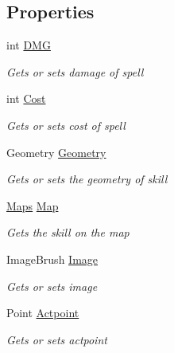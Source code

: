 \subsection*{Properties}
\begin{DoxyCompactItemize}
\item 
int \hyperlink{class_lightdeath_1_1_skills_a5f0f4b3c89f1f6b65485407a7c61708d}{D\+MG}
\begin{DoxyCompactList}\small\item\em Gets or sets damage of spell \end{DoxyCompactList}\item 
int \hyperlink{class_lightdeath_1_1_skills_a319e914b227ebf49e511031092e08ec0}{Cost}
\begin{DoxyCompactList}\small\item\em Gets or sets cost of spell \end{DoxyCompactList}\item 
Geometry \hyperlink{class_lightdeath_1_1_skills_a1824757727a15132061b239af0f915e1}{Geometry}
\begin{DoxyCompactList}\small\item\em Gets or sets the geometry of skill \end{DoxyCompactList}\item 
\hyperlink{class_lightdeath_1_1_maps}{Maps} \hyperlink{class_lightdeath_1_1_skills_aeaeff627c47ffcd9c7079337536005b3}{Map}
\begin{DoxyCompactList}\small\item\em Gets the skill on the map \end{DoxyCompactList}\item 
Image\+Brush \hyperlink{class_lightdeath_1_1_skills_a2a0ab366d440671974308c0883e6efd4}{Image}
\begin{DoxyCompactList}\small\item\em Gets or sets image \end{DoxyCompactList}\item 
Point \hyperlink{class_lightdeath_1_1_skills_a56fbb1a1791224bb4f7539a74478a77e}{Actpoint}
\begin{DoxyCompactList}\small\item\em Gets or sets actpoint \end{DoxyCompactList}\end{DoxyCompactItemize}
